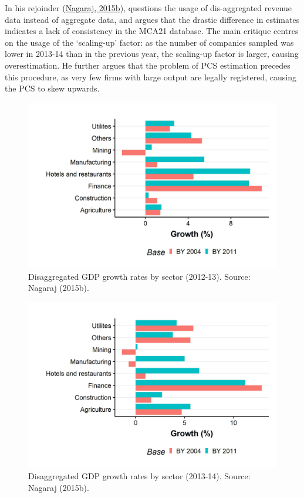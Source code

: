 \documentclass[12pt,nobind, a4paper]{reedthesis}
\begin{document}
 In his rejoinder (\protect\hyperlink{ref-nagaraj_seeds_2015}{Nagaraj, 2015b}), questions the usage of dis-aggregated revenue data instead of aggregate data, and argues that the drastic difference in estimates indicates a lack of consistency in the MCA21 database. The main critique centres on the usage of the `scaling-up' factor: as the number of companies sampled was lower in 2013-14 than in the previous year, the scaling-up factor is larger, causing overestimation. He further argues that the problem of PCS estimation precedes this procedure, as very few firms with large output are legally registered, causing the PCS to skew upwards.
 \begin{figure}

 {\centering \includegraphics[width=1\linewidth]{figure/nagaraj1} 

 }

 \caption{Disaggregated GDP growth rates by sector (2012-13). Source: Nagaraj (2015b).}\label{fig:nag1}
 \end{figure}
 \begin{figure}

 {\centering \includegraphics[width=1\linewidth]{figure/nagaraj2} 

 }

 \caption{Disaggregated GDP growth rates by sector (2013-14). Source: Nagaraj (2015b).}\label{fig:nag2}
 \end{figure}
\end{document}
